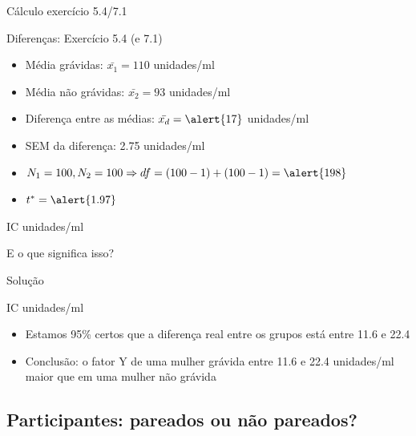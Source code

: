 \documentclass{beamer}
\begin{document}

\begin{frame}{Cálculo exercício 5.4/7.1}
  \begin{exampleblock}{Diferenças: Exercício 5.4 (e 7.1)}
    \begin{itemize}
    \item Média grávidas: $\bar{x_1} = 110$ unidades/ml
    \item Média não grávidas: $\bar{x_2} = 93$ unidades/ml
    \item Diferença entre as médias: $\bar{x_d} = \alert{17}$ unidades/ml
    \item SEM da diferença: \alert{2.75} unidades/ml
    \item $N_1=100, N_2=100 \Rightarrow df = (100 -1) + (100 - 1) = \alert{198}$
    \item $t^{*} = \alert{1.97}$
    \end{itemize}
  \end{exampleblock}
  \begin{exampleblock}{IC}
    \centering
    [11.6, 22.4] unidades/ml
  \end{exampleblock}
  E o que significa isso?
\end{frame}

\begin{frame}{Solução}
    \begin{exampleblock}{IC}
    \centering
    [11.6, 22.4] unidades/ml
  \end{exampleblock}
  \begin{itemize}
  \item Estamos 95\% certos que a diferença real entre os grupos está entre 11.6 e 22.4
  \item Conclusão: o fator Y de uma mulher grávida entre 11.6 e 22.4 unidades/ml maior que em uma mulher não grávida
  \end{itemize}
\end{frame}

\subsection{Participantes: pareados ou não pareados?}
\end{document}
